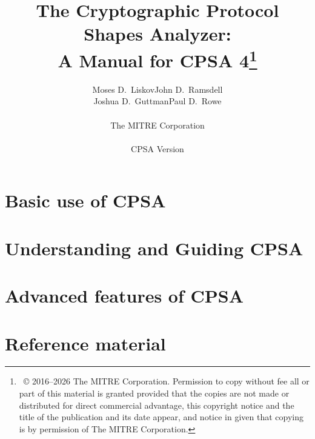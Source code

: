 \documentclass[11pt]{report}
\title{The Cryptographic Protocol Shapes Analyzer:\\ A Manual for CPSA
  4\thanks{\ {\copyright} 2016--2026 The
    MITRE Corporation.  Permission to copy without fee all or part of
    this material is granted provided that the copies are not made or
    distributed for direct commercial advantage, this copyright notice
    and the title of the publication and its date appear, and notice
    in given that copying is by permission of The MITRE
    Corporation.}}
\author{Moses D.~Liskov\qquad John D.~Ramsdell\\Joshua D.~Guttman\qquad Paul D.~Rowe\\ \\
  {\Large The MITRE Corporation}\\ \\ CPSA Version \version}
\newif\ifpubrel
\begin{document}
 

\ifpubrel
\thispagestyle{title}
\fi
\maketitle
\vfill
\ifpubrel
\thispagestyle{title}
\fi
{}

\tableofcontents

\listoffigures

\listoftables

\newpage
{}
\setcounter{page}{1}


\part{Basic use of CPSA}
\label{part:basic}



\part{Understanding and Guiding CPSA}
\label{part:intermediate}


\part{Advanced features of CPSA}
\label{part:advanced}


%

\part{Reference material}
\label{part:reference}







\printindex

% 
\end{document}
